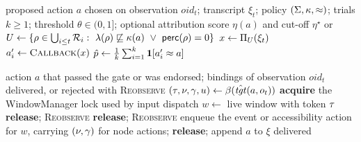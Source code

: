 \begin{algorithm}[t]
\caption{\CG{}: \textsc{Gate}$(a,\mathit{oid}_t)$}\label{alg:gate}
\small
\begin{algorithmic}[1]
\Require proposed action $a$ chosen on observation $\mathit{oid}_t$; transcript $\xi_t$; policy $(\Sigma,\kappa,\approx)$; trials $k\ge1$; threshold $\theta\in(0,1]$; optional attribution score $\eta(a)$ and cut-off $\eta^\star$
\Ensure \PASS{} or \ESC{}
 \Return \PASS {}
\EndIf
\State $\U\gets\{\rho\in\bigcup_{i\le t}\R_i:\ \lab(\rho)\nlle\clr(a)\ \lor\ \perc(\rho)=0\}$ 
 \Return \ESC {}
\EndIf
\State $x\gets\Pi_{U}(\xi_t)$ 
  \State $a'_i\gets\textsc{Callback}(x)$ 
\EndFor
\State $\hat p\gets\frac1k\sum_{i=1}^{k}\mathbf{1}[a'_i\approx a]$ 
 \Return \PASS \Else\ \Return \ESC
\EndIf
\end{algorithmic}
\end{algorithm}

\begin{algorithm}[t]
\caption{\DB{}: \textsc{Dispatch}$(a,\mathit{oid}_t)$}\label{alg:binder}
\small
\begin{algorithmic}[1]
\Require action $a$ that passed the gate or was endorsed; bindings of observation $\mathit{oid}_t$
\Ensure delivered, or rejected with \textsc{Reobserve}
\State $(\tau,\nu,\gamma,u)\gets\beta(\hat{\mathit{tgt}}(a,o_t))$ 
\State \textbf{acquire} the WindowManager lock used by input dispatch
\State $w\gets$ live window with token $\tau$
 \textbf{release}; \Return \textsc{Reobserve}
\EndIf
{} \textbf{release}; \Return \textsc{Reobserve}
\EndIf
\State enqueue the event or accessibility action for $w$, carrying $(\nu,\gamma)$ for node actions; \textbf{release}; append $a$ to $\xi$
\State {}
\State \Return delivered
\end{algorithmic}
\end{algorithm}

